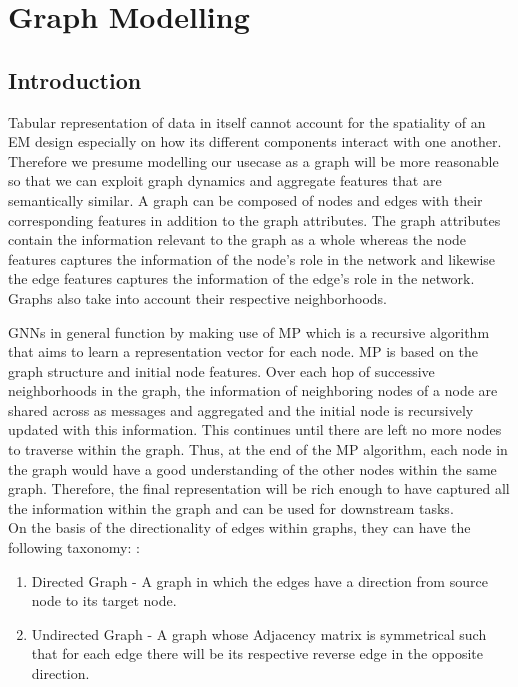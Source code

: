 \documentclass{report} %
\begin{document}
\chapter{Graph Modelling} 

\section{Introduction}\label{sec:Introduction}

Tabular representation of data in itself cannot account for the spatiality of an \ac{EM} design especially on how its different components interact with one another. 
Therefore we presume modelling our usecase as a graph will be more reasonable so that we can exploit graph dynamics and aggregate features that are semantically similar.
A graph can be composed of nodes and edges with their corresponding features in addition to the graph attributes.
The graph attributes contain the information relevant to the graph as a whole whereas the node features captures the information of the node's role in the network and 
likewise the edge features captures the information of the edge's role in the network. Graphs also take into account their respective neighborhoods.

\ac{GNN}s in general function by making use of \ac{MP} which is a recursive algorithm that aims to learn a representation vector for each node. 
\ac{MP} is based on the graph structure and initial node features. Over each hop of successive neighborhoods in the graph, the information of 
neighboring nodes of a node are shared across as messages and aggregated and the initial node is recursively updated with this information. 
This continues until there are left no more nodes to traverse within the graph.
Thus, at the end of the \ac{MP} algorithm, each node in the graph would have a good understanding of the other nodes within the same graph.
Therefore, the final representation will be rich enough to have captured all the information within the graph and can be used for downstream tasks.\\

On the basis of the directionality of edges within graphs, they can have the following taxonomy: \cite{GNN-2019}:
\begin{enumerate}
    \item Directed Graph - A graph in which the edges have a direction from source node to its target node.
    \item Undirected Graph - A graph whose Adjacency matrix is symmetrical such that for each edge there will be its respective reverse edge in the opposite direction.
\end{enumerate}
\end{document}
